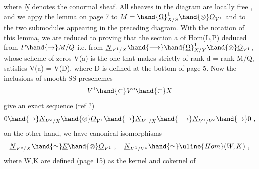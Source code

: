 where $\underline{N}$ denotes the conormal sheaf. All sheaves in the diagram are
locally free , and we appy the lemma on page 7 to $M=\hand{\underline{\Omega}}^1_{X/S}\hand{\otimes}\underline{O}_{V^1}$
and to the two submodules appearing in the preceding diagram. With
the notation of this lemma, we are reduced to proving that the section a
 of \uline{Hom}(L,P) deduced from  $P\hand{\rightarrow} M/Q$ i.e. from  $\underline{N}_{V^1/X}\hand{\longrightarrow}\hand{\underline{\Omega}}^1_{X/Y}\hand{\otimes}\underline{O}_{V^1}$,
whose scheme of zeros V(a) is the one that makes \hand{$\mu$} strictly of rank
\hand{$<$} d = rank M/Q, satisfies V(a) = V(D), where D is defined at the bottom of
page 5. Now the inclusions of smooth SS-preschemes
\[ V^1 \hand{\subset} V^o \hand{\subset} X \]
give an exact sequence (ref ?)
\[ 0 \hand{\rightarrow} \underline{N}_{V^o/X}\hand{\otimes}\underline{O}_{V^1} \hand{\rightarrow} \underline{N}_{V^1/X} \hand{\longrightarrow} \underline{N}_{V^1/V^o} \hand{\rightarrow} 0 \ , \]
on the other hand, we have canonical isomorphisms
\[ \underline{N}_{V^o/X} \hand{\simeq} \underline{E}\hand{\otimes}\underline{O}_{V^1} \ , \quad \underline{N}_{V^1/V^o} \hand{\simeq} \uline{Hom}(W,K) \ , \]
where W,K are defined (page 15) as the kernel and cokernel of

